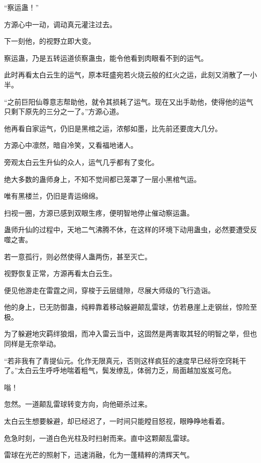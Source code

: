 
\begin{this_body}

“察运蛊！”

方源心中一动，调动真元灌注过去。

下一刻他，的视野立即大变。

察运蛊，乃是五转运道侦察蛊虫，能令他看到肉眼看不到的运气。

此时再看太白云生的运气，原本旺盛宛若火烧云般的红火之运，此刻又消散了一小半。

“之前巨阳仙尊意志帮助他，就令其损耗了运气。现在又出手助他，使得他的运气只剩下原先的三分之一了。”方源心道。

他再看自家运气，仍旧是黑棺之运，浓郁如墨，比先前还要庞大几分。

方源心中凛然，暗自冷笑，又看福地诸人。

旁观太白云生升仙的众人，运气几乎都有了变化。

绝大多数的蛊师身上，不知不觉间都已笼罩了一层小黑棺气运。

唯有黑楼兰，仍旧是青运绵绵。

扫视一圈，方源已感到双眼生疼，便明智地停止催动察运蛊。

蛊师升仙的过程中，天地二气沸腾不休，在这样的环境下动用蛊虫，必然要遭受反噬之害。

若一意孤行，则必然使得人蛊两伤，甚至灭亡。

视野恢复正常，方源再看太白云生。

便见他游走在雷霆之间，穿梭于云层缝隙，尽展大师级的飞行造诣。

他的身上，已无防御蛊，纯粹靠着移动躲避颠乱雷球，仿若悬崖上走钢丝，惊险至极。

为了躲避地灾羁绊狼烟，而冲入雷云当中，这固然是两害取其轻的明智之举，但也同样是无奈举动。

“若非我有了青提仙元。化作无限真元，否则这样疯狂的速度早已经将空窍耗干了。”太白云生呼呼地喘着粗气，鬓发缭乱，体弱力乏，局面越加岌岌可危。

嗡！

忽然。一道颠乱雷球转变方向，向他砸杀过来。

太白云生想要躲避，却已经迟了，一时间只能瞠目怒视，眼睁睁地看着。

危急时刻，一道白色光柱及时扫射而来。直中这颗颠乱雷球。

雷球在光芒的照射下，迅速消融，化为一蓬精粹的清辉天气。


\end{this_body}

